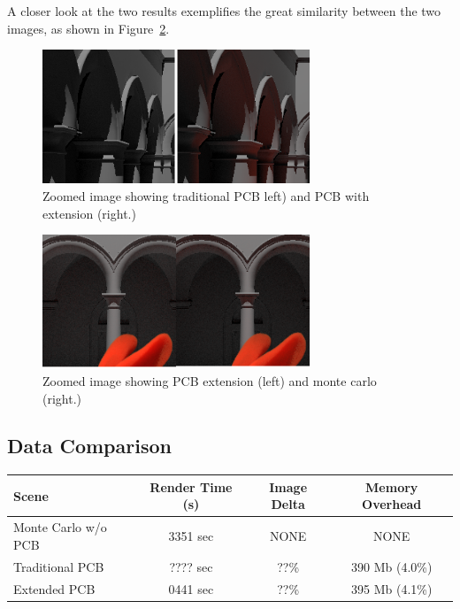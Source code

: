 \documentclass[runningheads]{llncs}
\begin{document}
A closer look at the two results exemplifies the great similarity between the two images, as shown in Figure~\ref{fig:compare_close}.

\begin{figure}[h!]
    \centering
    \includegraphics[width=80mm]{img/compare_trad.png}
    \caption{Zoomed image showing traditional PCB left) and PCB with extension (right.)}
    \label{fig:compare_trad}
\end{figure}

\begin{figure}[h!]
    \centering
    \includegraphics[width=80mm]{img/compare1.png}
    \caption{Zoomed image showing PCB extension (left) and monte carlo (right.)}
    \label{fig:compare_close}
\end{figure}

\subsection{Data Comparison}

\begin{center}
\setlength{\tabcolsep}{5pt}
\begin{tabular}{ | l | c | c | c | }
  \hline                       
  Scene & Render Time (s) & Image Delta & Memory Overhead \\
  \hline                  
  Monte Carlo w/o PCB & 3351 sec & NONE & NONE \\
  Traditional PCB & ???? sec & ??\% & 390 Mb (4.0\%) \\
  Extended PCB & 0441 sec & ??\% & 395 Mb (4.1\%)  \\
  \hline  
\end{tabular}
\end{center}
\end{document}
